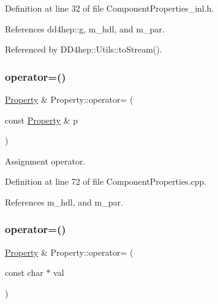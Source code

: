 Definition at line 32 of file Component\+Properties\+\_\+inl.\+h.



References dd4hep\+::g, m\+\_\+hdl, and m\+\_\+par.



Referenced by D\+D4hep\+::\+Utils\+::to\+Stream().

\hypertarget{class_d_d4hep_1_1_property_a18c732c983b1ae9f1c1cc801e6e17706}{}\label{class_d_d4hep_1_1_property_a18c732c983b1ae9f1c1cc801e6e17706} 
\subsubsection{\texorpdfstring{operator=()}{operator=()}\hspace{0.1cm}{\footnotesize\ttfamily [1/3]}}
{\footnotesize\ttfamily \hyperlink{class_d_d4hep_1_1_property}{Property} \& Property\+::operator= (\begin{DoxyParamCaption}\item[{const \hyperlink{class_d_d4hep_1_1_property}{Property} \&}]{p }\end{DoxyParamCaption})}



Assignment operator. 



Definition at line 72 of file Component\+Properties.\+cpp.



References m\+\_\+hdl, and m\+\_\+par.

\hypertarget{class_d_d4hep_1_1_property_a5b6de39455110bc81a239a92115d816e}{}\label{class_d_d4hep_1_1_property_a5b6de39455110bc81a239a92115d816e} 
\subsubsection{\texorpdfstring{operator=()}{operator=()}\hspace{0.1cm}{\footnotesize\ttfamily [2/3]}}
{\footnotesize\ttfamily \hyperlink{class_d_d4hep_1_1_property}{Property} \& Property\+::operator= (\begin{DoxyParamCaption}\item[{const char $\ast$}]{val }\end{DoxyParamCaption})}



